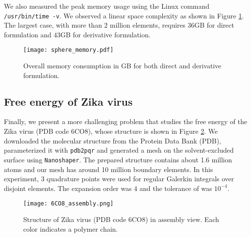 We also measured the peak memory usage using the Linux command \texttt{/usr/bin/time -v}.
We observed a linear space complexity as shown in Figure \ref{fig:sphere_memory}.
The largest case, with more than $2$ million elements, requires $36$GB for direct formulation and $43$GB for derivative formulation.

\begin{figure}%
    \centering
    \texttt{[image: sphere\_memory.pdf]} 
    \caption{Overall memory consumption in GB for both direct and derivative formulation.}
    \label{fig:sphere_memory}
\end{figure}

\subsection{Free energy of Zika virus} \label{result_zika}

Finally, we present a more challenging problem that studies the free energy of the Zika virus (PDB code 6CO8), whose structure \cite{sevvana2018refinement} is shown in Figure \ref{fig:6CO8_assembly}.
We downloaded the molecular structure from the Protein Data Bank (PDB), parameterized it with \texttt{pdb2pqr} and generated a mesh on the solvent-excluded surface using \texttt{Nanoshaper}.
The prepared structure contains about 1.6 million atoms and our mesh has around 10 million boundary elements.
In this experiment, 3 quadrature points were used for regular Galerkin integrals over disjoint elements.
The \fmm expansion order was 4 and the tolerance of \gmres was $10^{-4}$.

\begin{figure}%
    \centering
    \texttt{[image: 6CO8\_assembly.png]} 
    \caption{Structure of Zika virus (PDB code 6CO8) in assembly view. Each color indicates a polymer chain.}
    \label{fig:6CO8_assembly}
\end{figure}


